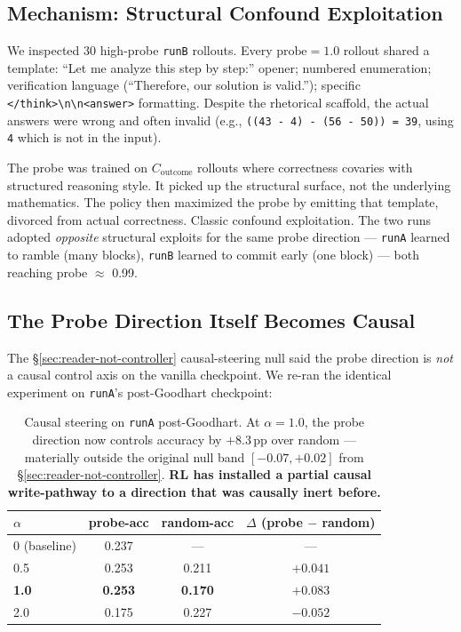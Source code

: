 \documentclass[11pt]{article}
\begin{document}
\subsection{Mechanism: Structural Confound Exploitation}

We inspected 30 high-probe \texttt{runB} rollouts. Every $\text{probe}{=}1.0$ rollout shared a template: ``Let me analyze this step by step:'' opener; numbered enumeration; verification language (``Therefore, our solution is valid.''); specific \texttt{</think>\textbackslash n\textbackslash n<answer>} formatting. Despite the rhetorical scaffold, the actual answers were wrong and often invalid (e.g., \texttt{((43 - 4) - (56 - 50)) = 39}, using \texttt{4} which is not in the input).

The probe was trained on $C_{\text{outcome}}$ rollouts where correctness covaries with structured reasoning style. It picked up the structural surface, not the underlying mathematics. The policy then maximized the probe by emitting that template, divorced from actual correctness. Classic confound exploitation. The two runs adopted \emph{opposite} structural exploits for the same probe direction --- \texttt{runA} learned to ramble (many blocks), \texttt{runB} learned to commit early (one block) --- both reaching probe $\approx$ 0.99.

\subsection{The Probe Direction Itself Becomes Causal}\label{sec:probe-rl-causal}

The §\ref{sec:reader-not-controller} causal-steering null said the probe direction is \emph{not} a causal control axis on the vanilla checkpoint. We re-ran the identical experiment on \texttt{runA}'s post-Goodhart checkpoint:

\begin{table}[h]
\centering
\small
\begin{tabular}{lccc}
\toprule
$\alpha$ & probe-acc & random-acc & $\Delta$ (probe $-$ random) \\
\midrule
0 (baseline) & 0.237 & --- & --- \\
0.5 & 0.253 & 0.211 & $+0.041$ \\
\textbf{1.0} & \textbf{0.253} & \textbf{0.170} & \textbf{$+0.083$} \\
2.0 & 0.175 & 0.227 & $-0.052$ \\
\bottomrule
\end{tabular}
\caption{Causal steering on \texttt{runA} post-Goodhart. At $\alpha{=}1.0$, the probe direction now controls accuracy by $+8.3$\,pp over random --- materially outside the original null band $[-0.07, +0.02]$ from §\ref{sec:reader-not-controller}. \textbf{RL has installed a partial causal write-pathway to a direction that was causally inert before.}}
\end{table}
\end{document}
